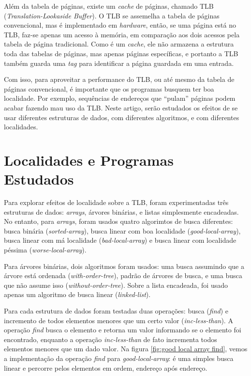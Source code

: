 \documentclass[a4paper]{article}
\begin{document}
Além da tabela de páginas, existe um \textit{cache} de páginas, chamado TLB
(\textit{Translation-Lookaside Buffer}). O TLB se assemelha a tabela de
páginas convencional, mas é implementado em \textit{hardware}, então, se uma
página está no TLB, faz-se apenas um acesso à memória, em comparação aos
dois acessos pela tabela de página tradicional. Como é um \textit{cache}, ele
não armazena a estrutura toda das tabelas de páginas, mas apenas páginas
específicas, e portanto a TLB também guarda uma \textit{tag} para identificar a
página guardada em uma entrada.

Com isso, para aproveitar a performance do TLB, ou até mesmo da tabela de
páginas convencional, é importante que os programas busquem ter boa localidade.
Por exemplo, sequências de endereços que ``pulam'' páginas podem acabar fazendo
mau uso da TLB. Neste artigo, serão estudados os efeitos de se usar diferentes
estruturas de dados, com diferentes algoritmos, e com diferentes localidades.

\section{Localidades e Programas Estudados}

\FloatBarrier

Para explorar efeitos de localidade sobre a TLB, foram experimentadas três
estruturas de dados: \textit{arrays}, árvores binárias, e listas simplesmente
encadeadas. No entanto, para \textit{arrays}, foram usados quatro algorimtos de
busca diferentes: busca binária (\textit{sorted-array}), busca linear com boa
localidade (\textit{good-local-array}), busca linear com má localidade
(\textit{bad-local-array}) e busca linear com localidade péssima
(\textit{worse-local-array}).

Para árvores binárias, dois algoritmos foram usados: uma busca assumindo que a
árvore está ordenada (\textit{with-order-tree}), padrão de árvores de busca, e
uma busca que não assume isso (\textit{without-order-tree}). Sobre a lista
encadeada, foi usado apenas um algoritmo de busca linear (\textit{linked-list}).

Para cada estrutura de dados foram testadas duas operações: busca
(\textit{find}) e incremento de todos elementos menores que um certo valor
(\textit{inc-less-than}). A operação \textit{find} busca o elemento e retorna
um valor informando se o elemento foi encontrado, enquanto a operação
\textit{inc-less-than} de fato incrementa todos elementos menores que um dado
valor. Na figura \ref{fig:good local array find}, vemos a implementação da
operação \textit{find} para \textit{good-local-array}: é uma simples busca
linear e percorre pelos elementos em ordem, endereço após endereço.
\end{document}
